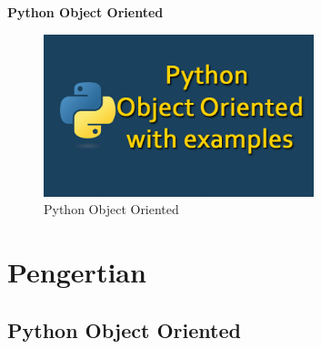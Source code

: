  \sloppy
\begin{center}{\fontsize{16pt}{16pt}\selectfont \textbf{Python Object Oriented} \\}\end{center}


\begin{figure}[ht]
	\centerline{\includegraphics[width=0.70\textwidth]{Gambar/dapi3.jpg}}
	\caption{Python Object Oriented}
	\label{Python Object Oriented}
\end{figure}



\section {Pengertian }
\subsection {Python Object Oriented}

